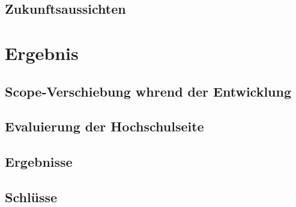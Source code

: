 	\section{Zukunftsaussichten}
	
\chapter{Ergebnis}
	\section{Scope-Verschiebung whrend der Entwicklung}
	\section{Evaluierung der Hochschulseite}
	\section{Ergebnisse}
	\section{Schlüsse}
